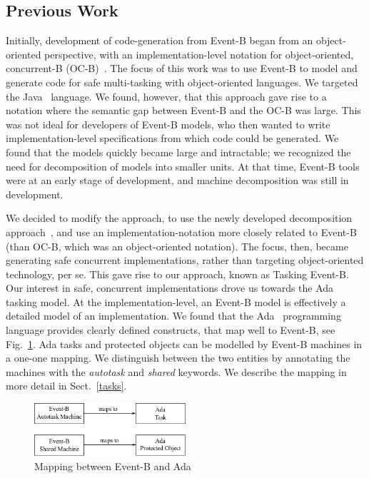 \subsection{Previous Work}
Initially, development of code-generation from Event-B began from an object-oriented perspective, with an implementation-level notation for object-oriented, concurrent-B (OC-B)~\cite{Edmunds2009}. The focus of this work was to use Event-B  to model and generate code for safe multi-tasking with object-oriented languages. We targeted the Java~\cite{JavaSpec} language. We found, however, that this approach gave rise to a notation where the semantic gap between Event-B and the OC-B was large. This was not ideal for developers of Event-B models, who then wanted to write implementation-level specifications from which code could be generated. We found that the models quickly became large and intractable; we recognized the need for decomposition of models into smaller units. At that time, Event-B tools were at an early stage of development, and machine decomposition was still in development. 

We decided to modify the approach, to use the newly developed decomposition approach~\cite{decomp2010c,decomp2010b}, and use an implementation-notation more closely related to Event-B (than OC-B, which was an object-oriented notation). The focus, then, became generating safe concurrent implementations, rather than targeting object-oriented technology, per se. This gave rise to our approach, known as Tasking Event-B. Our interest in safe, concurrent implementations drove us towards the Ada tasking model. At the implementation-level, an Event-B model is effectively a detailed model of an implementation. We found that the Ada~\cite{ada2005} programming language provides clearly defined constructs, that map well to Event-B, see Fig.~\ref{fig:B_Ada}. Ada tasks and protected objects can be modelled by Event-B machines in a one-one mapping. We distinguish between the two entities by annotating the machines with the \emph{autotask} and \emph{shared} keywords. We describe the mapping in more detail in Sect.~\ref{tasks}.
%
\begin{figure}
\centering
\includegraphics[width=0.5\textwidth]{graphics/B_Ada.png}
\caption{Mapping between Event-B and Ada}
\label{fig:B_Ada}
\end{figure}
%

